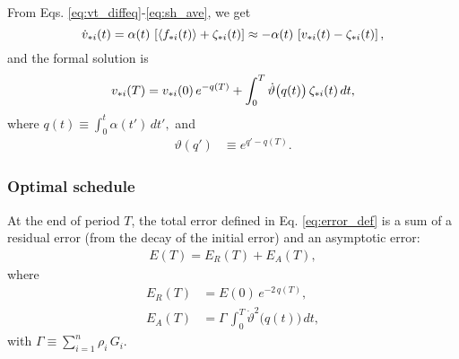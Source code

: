 \documentclass[reprint, superscriptaddress, floatfix]{revtex4-1}
\newcommand{\Err}{E}
\begin{document}
From Eqs.
\eqref{eq:vt_diffeq}-\eqref{eq:sh_ave},
we get %
%
\begin{equation}
  \dot v_{*i}(t)
  =
  \alpha(t) \, \left[ \langle f_{*i}(t) \rangle + \zeta_{*i}(t) \right]
  \approx
  -\alpha(t) \, \left[ v_{*i}(t) - \zeta_{*i}(t) \right]
  ,
  \notag
\end{equation}
%
and the formal solution is
%
\begin{equation}
  v_{*i}(T)
=
  v_{*i}(0) \, e^{-q(T)}
+
\int_0^T
  \dot \vartheta\bigl( q(t) \bigr) \, \zeta_{*i}(t) \, dt,
\notag
\end{equation}
%
where
%
$
q(t) \equiv \int_0^t \alpha(t') \, dt',
$
%
and
%
\begin{align}
\vartheta(q')
&\equiv
e^{q' - q(T)}.
\label{eq:theta_def}
\end{align}



\subsubsection{Optimal schedule}



At the end of period $T$,
the total error defined in Eq. \eqref{eq:error_def}
is a sum of a residual error (from the decay of the initial error)
and an asymptotic error:
%
\begin{align}
  \Err(T)
  =
  \Err_R(T) + \Err_A(T)
  ,
  \label{eq:error_tot}
\end{align}
%
where
\begin{align}
  \Err_R(T)
  &= \Err(0) \, e^{-2 \, q(T)}
  ,
  \label{eq:ER_sbin}
  \\
  \Err_A(T)
  &= \Gamma \, \int_0^T \dot \vartheta^2\bigl( q(t) \bigr) \, dt
  ,
  \label{eq:EA_sbin}
\end{align}
with
$\Gamma \equiv \sum_{i=1}^n \rho_i \, G_i$.
\end{document}
